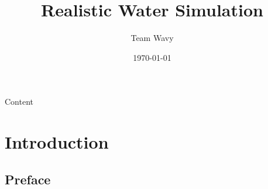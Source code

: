 \documentclass[handout,t]{beamer}
\title{Realistic Water Simulation}
\author{Team Wavy}
\institute{School of Data and Computer Science(SYSU)}
\date{\today}
\begin{document}

\frame{\titlepage}
\section[]{}
\begin{frame}{Content}
  \tableofcontents
\end{frame}

\section{Introduction}
\subsection{Preface}
\end{document}
